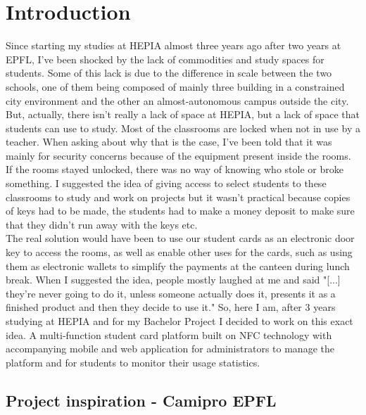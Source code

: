 \documentclass[11pt,a4paper]{report}
\begin{document}
\chapter{Introduction}
Since starting my studies at HEPIA almost three years ago after two years at EPFL, I've been shocked by the lack of commodities and study spaces for students. Some of this lack is due to the difference in scale between the two schools, one of them being composed of mainly three building in a constrained city environment and the other an almost-autonomous campus outside the city. But, actually, there isn't really a lack of space at HEPIA, but a lack of space that students can use to study. Most of the classrooms are locked when not in use by a teacher. When asking about why that is the case, I've been told that it was mainly for security concerns because of the equipment present inside the rooms. If the rooms stayed unlocked, there was no way of knowing who stole or broke something. I suggested the idea of giving access to select students to these classrooms to study and work on projects but it wasn't practical because copies of keys had to be made, the students had to make a money deposit to make sure that they didn't run away with the keys etc.\\ 

The real solution would have been to use our student cards as an electronic door key to access the rooms, as well as enable other uses for the cards, such as using them as electronic wallets to simplify the payments at the canteen during lunch break. When I suggested the idea, people mostly laughed at me and said "[...] they're never going to do it, unless someone actually does it, presents it as a finished product and then they decide to use it." So, here I am, after 3 years studying at HEPIA and for my Bachelor Project I decided to work on this exact idea. A multi-function student card platform built on NFC technology with accompanying mobile and web application for administrators to manage the platform and for students to monitor their usage statistics.


\section{Project inspiration - Camipro EPFL}
\end{document}
